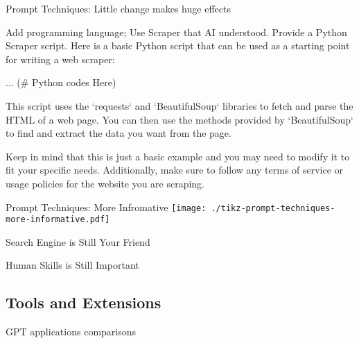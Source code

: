 \documentclass{beamer}
\newcommand{\askanswer}[5]{ %
  \begin{tcolorbox}[
    title=#1,
    skin=bicolor,
    colframe=black,
    colbacklower=green!10,
    fontupper=\small,
    fontlower=\footnotesize,
    middle=0pt, %
    subtitle style = {
      boxrule=0.4pt,
      colback=gray,
    }
  ]
    #2
    \tcbsubtitle{You}
    {\color{blue} #3}
    \tcblower
    \tcbsubtitle{#4}
    #5
  \end{tcolorbox}
}
\begin{document}
\begin{frame}{Prompt Techniques: Little change makes huge effects}
  \askanswer{Little change makes huge effects}
  {Add programming language; Use Scraper that AI understood.}
  {Provide a Python Scraper script.}
  {Bing AI}
  {Here is a basic Python script that can be used as a starting point for writing a web scraper:
  
  ... {\color{green!50!black} (\# Python codes Here)}
      
      
      

  This script uses the `requests` and `BeautifulSoup` libraries to fetch and parse the HTML of a web page. You can then use the methods provided by `BeautifulSoup` to find and extract the data you want from the page.
  
  Keep in mind that this is just a basic example and you may need to modify it to fit your specific needs. Additionally, make sure to follow any terms of service or usage policies for the website you are scraping.}

\end{frame}

\begin{frame}{Prompt Techniques: More Infromative}
  \centering
  \texttt{[image: ./tikz-prompt-techniques-more-informative.pdf]}
\end{frame}

\begin{frame}{Search Engine is Still Your Friend}
\end{frame}

\begin{frame}{Human Skills is Still Important}
\end{frame}

\subsection{Tools and Extensions}
\begin{frame}{GPT applications comparisons}
  
\end{frame}
\end{document}
